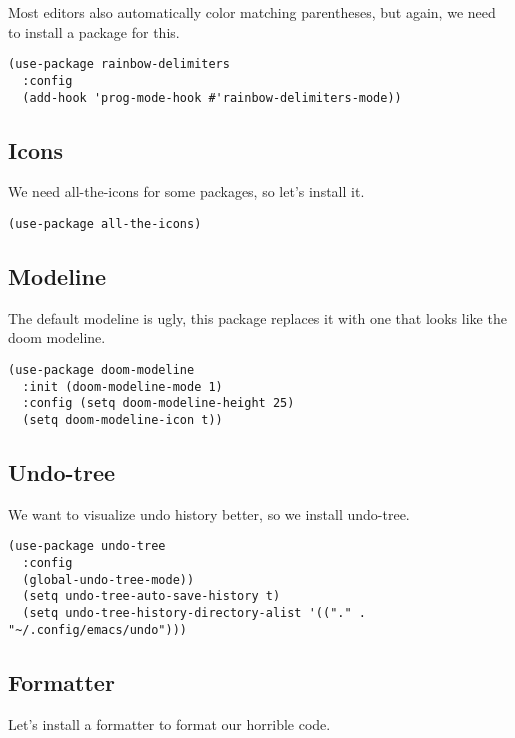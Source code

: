 \documentclass[11pt]{article}
\begin{document}
Most editors also automatically color matching parentheses, but again, we need to install a package for this.

\begin{verbatim}
(use-package rainbow-delimiters
  :config
  (add-hook 'prog-mode-hook #'rainbow-delimiters-mode))
\end{verbatim}

\subsection*{Icons}
\label{sec:org25ed66b}

We need all-the-icons for some packages, so let's install it.

\begin{verbatim}
(use-package all-the-icons)
\end{verbatim}

\subsection*{Modeline}
\label{sec:org2aaed79}

The default modeline is ugly, this package replaces it with one that looks like the doom modeline.

\begin{verbatim}
(use-package doom-modeline
  :init (doom-modeline-mode 1)
  :config (setq doom-modeline-height 25)
  (setq doom-modeline-icon t))
\end{verbatim}

\subsection*{Undo-tree}
\label{sec:org544f218}

We want to visualize undo history better, so we install undo-tree.

\begin{verbatim}
(use-package undo-tree
  :config
  (global-undo-tree-mode))
  (setq undo-tree-auto-save-history t)
  (setq undo-tree-history-directory-alist '(("." . "~/.config/emacs/undo")))
\end{verbatim}

\subsection*{Formatter}
\label{sec:org24e3f50}

Let's install a formatter to format our horrible code.
\end{document}
